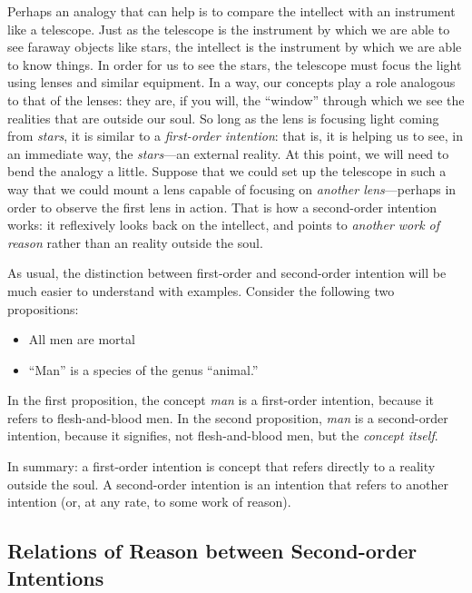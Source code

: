\documentclass[
  12pt,
]{memoir}
\providecommand{\tightlist}{%
  \setlength{\itemsep}{0pt}\setlength{\parskip}{0pt}}
\begin{document}
Perhaps an analogy that can help is to compare the intellect with an
instrument like a telescope. Just as the telescope is the instrument by
which we are able to see faraway objects like stars, the intellect is
the instrument by which we are able to know things. In order for us to
see the stars, the telescope must focus the light using lenses and
similar equipment. In a way, our concepts play a role analogous to that
of the lenses: they are, if you will, the ``window'' through which we
see the realities that are outside our soul. So long as the lens is
focusing light coming from \emph{stars}, it is similar to a
\emph{first-order intention}: that is, it is helping us to see, in an
immediate way, the \emph{stars}---an external reality. At this point, we
will need to bend the analogy a little. Suppose that we could set up the
telescope in such a way that we could mount a lens capable of focusing
on \emph{another lens}---perhaps in order to observe the first lens in
action. That is how a second-order intention works: it reflexively looks
back on the intellect, and points to \emph{another work of reason}
rather than an reality outside the soul.

As usual, the distinction between first-order and second-order intention
will be much easier to understand with examples. Consider the following
two propositions:

\begin{itemize}
\tightlist
\item
  All men are mortal
\item
  ``Man'' is a species of the genus ``animal.''
\end{itemize}

\indent In the first proposition, the concept \emph{man} is a
first-order intention, because it refers to flesh-and-blood men. In the
second proposition, \emph{man} is a second-order intention, because it
signifies, not flesh-and-blood men, but the \emph{concept itself}.

In summary: a first-order intention is concept that refers directly to a
reality outside the soul. A second-order intention is an intention that
refers to another intention (or, at any rate, to some work of reason).

\subsection{Relations of Reason between Second-order
Intentions}\label{relations-of-reason-between-second-order-intentions}
\end{document}

